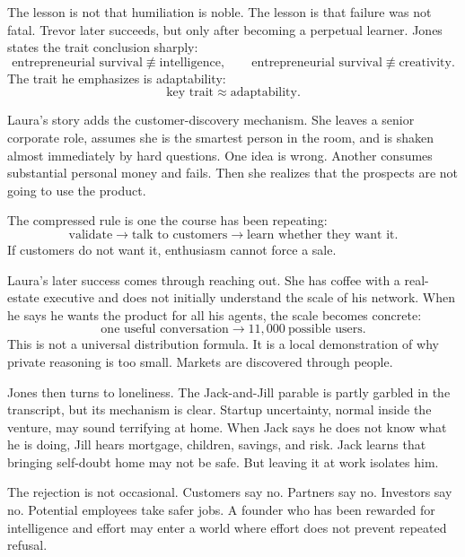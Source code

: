 The lesson is not that humiliation is noble. The lesson is that failure was not fatal. Trevor later succeeds, but only after becoming a perpetual learner. Jones states the trait conclusion sharply:
\begin{equation}
\text{entrepreneurial survival}
\not\equiv
\text{intelligence},
\qquad
\text{entrepreneurial survival}
\not\equiv
\text{creativity}.
\end{equation}
The trait he emphasizes is adaptability:
\begin{equation}
\text{key trait}\approx \text{adaptability}.
\end{equation}

Laura's story adds the customer-discovery mechanism. She leaves a senior corporate role, assumes she is the smartest person in the room, and is shaken almost immediately by hard questions. One idea is wrong. Another consumes substantial personal money and fails. Then she realizes that the prospects are not going to use the product.

The compressed rule is one the course has been repeating:
\begin{equation}
\text{validate}
\longrightarrow
\text{talk to customers}
\longrightarrow
\text{learn whether they want it}.
\end{equation}
If customers do not want it, enthusiasm cannot force a sale.

Laura's later success comes through reaching out. She has coffee with a real-estate executive and does not initially understand the scale of his network. When he says he wants the product for all his agents, the scale becomes concrete:
\begin{equation}
\text{one useful conversation}
\longrightarrow
11{,}000\ \text{possible users}.
\end{equation}
This is not a universal distribution formula. It is a local demonstration of why private reasoning is too small. Markets are discovered through people.

Jones then turns to loneliness. The Jack-and-Jill parable is partly garbled in the transcript, but its mechanism is clear. Startup uncertainty, normal inside the venture, may sound terrifying at home. When Jack says he does not know what he is doing, Jill hears mortgage, children, savings, and risk. Jack learns that bringing self-doubt home may not be safe. But leaving it at work isolates him.

The rejection is not occasional. Customers say no. Partners say no. Investors say no. Potential employees take safer jobs. A founder who has been rewarded for intelligence and effort may enter a world where effort does not prevent repeated refusal.

